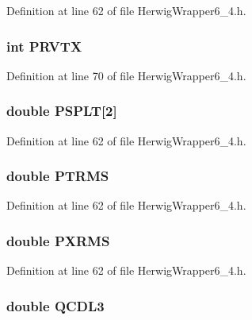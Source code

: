 Definition at line 62 of file Herwig\-Wrapper6\_\-4.h.
\subsubsection{\setlength{\rightskip}{0pt plus 5cm}int {\bf PRVTX}}\label{HerwigWrapper6__4_8h_c95e1dd19695aefcd478eba8fc98a45b}




Definition at line 70 of file Herwig\-Wrapper6\_\-4.h.
\subsubsection{\setlength{\rightskip}{0pt plus 5cm}double {\bf PSPLT}[2]}\label{HerwigWrapper6__4_8h_a09c68bfc80b96ea34f1ff1ed2984210}




Definition at line 62 of file Herwig\-Wrapper6\_\-4.h.
\subsubsection{\setlength{\rightskip}{0pt plus 5cm}double {\bf PTRMS}}\label{HerwigWrapper6__4_8h_cb1f78f2cadccda8f403fbeb2d48e692}




Definition at line 62 of file Herwig\-Wrapper6\_\-4.h.
\subsubsection{\setlength{\rightskip}{0pt plus 5cm}double {\bf PXRMS}}\label{HerwigWrapper6__4_8h_3c3f22a47f675605f6a6617df5877fb3}




Definition at line 62 of file Herwig\-Wrapper6\_\-4.h.
\subsubsection{\setlength{\rightskip}{0pt plus 5cm}double {\bf QCDL3}}\label{HerwigWrapper6__4_8h_69e4f189154f22f42bc3bce5e27b549e}




